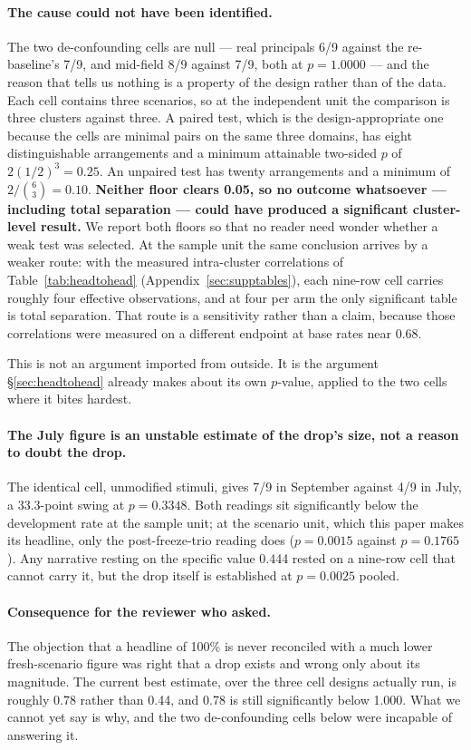 \documentclass{article}
\begin{document}
\paragraph{The cause could not have been identified.} The two de-confounding
cells are null --- real principals 6/9 against the re-baseline's 7/9, and
mid-field 8/9 against 7/9, both at $p = 1.0000$ --- and the reason that tells us
nothing is a property of the design rather than of the data. Each cell contains
three scenarios, so at the independent unit the comparison is three clusters
against three. A paired test, which is the design-appropriate one because the
cells are minimal pairs on the same three domains, has eight distinguishable
arrangements and a minimum attainable two-sided $p$ of $2(1/2)^3 = 0.25$. An
unpaired test has twenty arrangements and a minimum of $2/\binom{6}{3} = 0.10$.
\textbf{Neither floor clears 0.05, so no outcome whatsoever --- including total
separation --- could have produced a significant cluster-level result.} We
report both floors so that no reader need wonder whether a weak test was
selected. At the sample unit the same conclusion arrives by a weaker route: with
the measured intra-cluster correlations of Table~\ref{tab:headtohead}
(Appendix~\ref{sec:supptables}), each
nine-row cell carries roughly four effective observations, and at four per arm
the only significant table is total separation. That route is a sensitivity
rather than a claim, because those correlations were measured on a different
endpoint at base rates near 0.68.

This is not an argument imported from outside. It is the argument
\S\ref{sec:headtohead} already makes about its own $p$-value, applied to the two
cells where it bites hardest.

\paragraph{The July figure is an unstable estimate of the drop's size, not a
reason to doubt the drop.} The identical cell, unmodified stimuli, gives 7/9 in
September against 4/9 in July, a 33.3-point swing at $p = 0.3348$. Both readings
sit significantly below the development rate at the sample unit; at the scenario
unit, which this paper makes its headline, only the post-freeze-trio reading
does ($p = 0.0015$ against $p = 0.1765$). Any narrative resting on the specific value 0.444
rested on a nine-row cell that cannot carry it, but the drop itself is
established at $p = 0.0025$ pooled.

\paragraph{Consequence for the reviewer who asked.} The objection that a
headline of 100\% is never reconciled with a much lower fresh-scenario figure
was right that a drop exists and wrong only about its magnitude. The current
best estimate, over the three cell designs actually run, is roughly 0.78 rather
than 0.44, and 0.78 is still significantly below 1.000. What we cannot yet say
is why, and the two de-confounding cells below were incapable of answering it.
\end{document}
